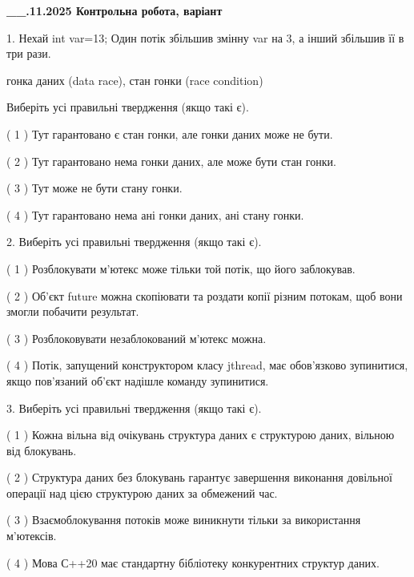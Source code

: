 \documentclass[12pt, ukrainian]{article}
\begin{document}
\begin {large}



\textbf{\_\_.11.2025 Контрольна робота, варіант  }\par


{
1. Нехай int var=13; Один потік збільшив змінну var на 3, а інший збільшив її в три рази.

гонка даних (data race), стан гонки (race condition)

Виберіть усі правильні твердження (якщо такі є).\par
\vspace{2mm}
( 1 ) Тут гарантовано є стан гонки, але гонки даних може не бути.%

( 2 ) Тут гарантовано нема гонки даних, але може бути стан гонки.%

( 3 ) Тут може не бути стану гонки.%

( 4 ) Тут гарантовано нема ані гонки даних, ані стану гонки.%


2. Виберіть усі правильні твердження (якщо такі є).\par
\vspace{2mm}

( 1 ) Розблокувати м’ютекс може тільки той потік, що його заблокував.%

( 2 ) Об’єкт future можна скопіювати та роздати копії різним потокам, щоб вони змогли побачити результат.%

( 3 ) Розблоковувати незаблокований м’ютекс можна.%

( 4 ) Потік, запущений конструктором класу jthread, має обов’язково зупинитися, якщо пов’язаний об’єкт надішле команду зупинитися.%


3. Виберіть усі правильні твердження (якщо такі є).\par
\vspace{2mm}

( 1 ) Кожна вільна від очікувань структура даних є структурою даних, вільною від блокувань.%

( 2 ) Структура даних без блокувань гарантує завершення виконання довільної операції над цією структурою даних за обмежений час.%

( 3 ) Взаємоблокування потоків може виникнути тільки за використання м’ютексів.%

( 4 ) Мова С++20 має стандартну бібліотеку конкурентних структур даних.%


}
\end{large}
\end{document}
